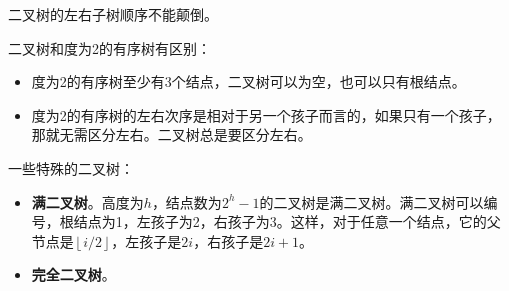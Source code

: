 \documentclass[12pt, a4paper, oneside]{ctexart}
\begin{document}
二叉树的左右子树顺序不能颠倒。

二叉树和度为2的有序树有区别：
\begin{itemize}
  \item 度为2的有序树至少有3个结点，二叉树可以为空，也可以只有根结点。
  \item 度为2的有序树的左右次序是相对于另一个孩子而言的，如果只有一个孩子，那就无需区分左右。二叉树总是要区分左右。
\end{itemize}

一些特殊的二叉树：
\begin{itemize}
  \item {\bf 满二叉树}。高度为$h$，结点数为$2^h-1$的二叉树是满二叉树。满二叉树可以编号，根结点为1，左孩子为2，右孩子为3。这样，对于任意一个结点，它的父节点是$\left\lfloor i/2 \right\rfloor$，左孩子是$2i$，右孩子是$2i+1$。
  \item {\bf 完全二叉树}。
\end{itemize}
\end{document}
